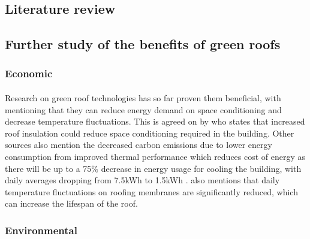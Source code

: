 \documentclass[a4paper]{article}
\begin{document}
\begin{multicols}{2}
  \section{Literature review}
  \subsection{Further study of the benefits of green roofs} \label{sec:grben}
  \subsubsection{Economic}
  \paragraph{} Research on green roof technologies has so far proven them
  beneficial, with \textcite{energeff} mentioning that they can reduce energy
  demand on space conditioning and decrease temperature fluctuations. This
  is agreed on by \textcite{CFGRSG} who states that increased roof insulation
  could reduce space conditioning required in the building. Other
  sources also mention the decreased carbon emissions due to lower energy
  consumption from improved thermal performance \parencite{CommAwareGBSyd}
  which reduces cost of energy as there will be up to a 75\%
  decrease in energy usage for cooling the building, with daily averages
  dropping from 7.5kWh to 1.5kWh \parencite{energeff}. \textcite{energeff} also
  mentions that daily temperature fluctuations on roofing membranes are
  significantly reduced, which can increase the lifespan of the roof.


  \subsubsection{Environmental}

\end{multicols}
\end{document}
